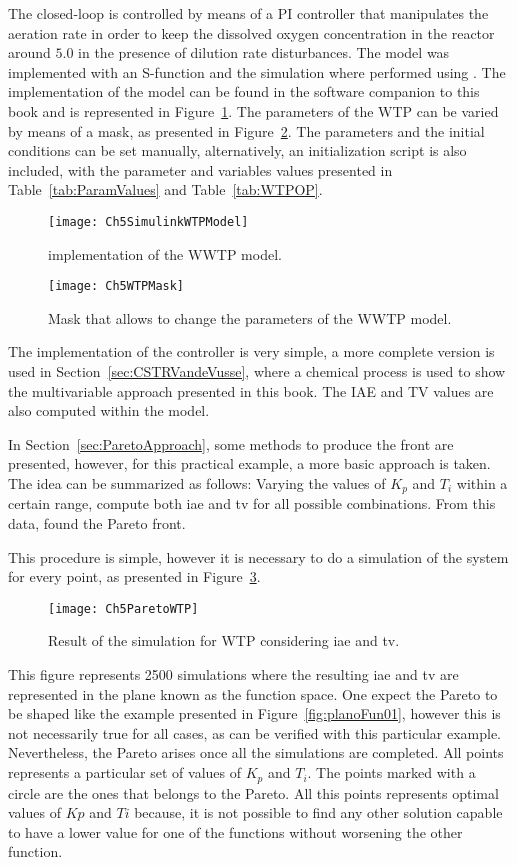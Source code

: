 The closed-loop is controlled by means of a PI controller that manipulates the aeration rate in order to keep the dissolved oxygen concentration in the reactor around $5.0$ in the presence of dilution rate disturbances. The model was implemented with an S-function and the simulation where performed using \simulink. The implementation of the model can be found in the software companion to this book and is represented in Figure~\ref{fig:Ch5SimulinkWTPModel}. The parameters of the WTP can be varied by means of a mask, as presented in Figure~\ref{fig:Ch5WTPMask}. The parameters and the initial conditions can be set manually, alternatively, an initialization script is also included, with the parameter and variables values presented in Table~\ref{tab:ParamValues} and Table~\ref{tab:WTPOP}.
%
\begin{figure}[tb]
	\centering
	\texttt{[image: Ch5SimulinkWTPModel]}
	\caption{\simulink implementation of the WWTP model.}
	\label{fig:Ch5SimulinkWTPModel}
\end{figure}
%
\begin{figure}[tb]
	\centering
	\texttt{[image: Ch5WTPMask]}
	\caption{Mask that allows to change the parameters of the WWTP model.}
	\label{fig:Ch5WTPMask}
\end{figure}

The implementation of the controller is very simple, a more complete version is used in Section~\ref{sec:CSTRVandeVusse}, where a chemical process is used to show the multivariable approach presented in this book. The IAE and TV values are also computed within the \simulink model.

In Section~\ref{sec:ParetoApproach}, some methods to produce the front are presented, however, for this practical example, a more basic approach is taken. The idea can be summarized as follows: Varying the values of $K_p$ and $T_i$ within a certain range, compute both \gls{iae} and \gls{tv} for all possible combinations. From this data, found the Pareto front.

This procedure is simple, however it is necessary to do a simulation of the system for every point, as presented in Figure~\ref{fig:Ch5ParetoWTP}. %
\begin{figure}
	\centering
	\texttt{[image: Ch5ParetoWTP]}
	\caption{Result of the simulation for WTP considering \gls{iae} and \gls{tv}.}
	\label{fig:Ch5ParetoWTP}
\end{figure}
%
This figure represents 2500 simulations where the resulting \gls{iae} and \gls{tv} are represented in the plane known as the function space. One expect the Pareto to be shaped like the example presented in Figure~\ref{fig:planoFun01}, however this is not necessarily true for all cases, as can be verified with this particular example. Nevertheless, the Pareto arises once all the simulations are completed. All points represents a particular set of values of $K_p$ and $T_i$. The points marked with a circle are the ones that belongs to the Pareto. All this points represents optimal values of $Kp$ and $Ti$ because, it is not possible to find any other solution capable to have a lower value for one of the functions without worsening the other function.

